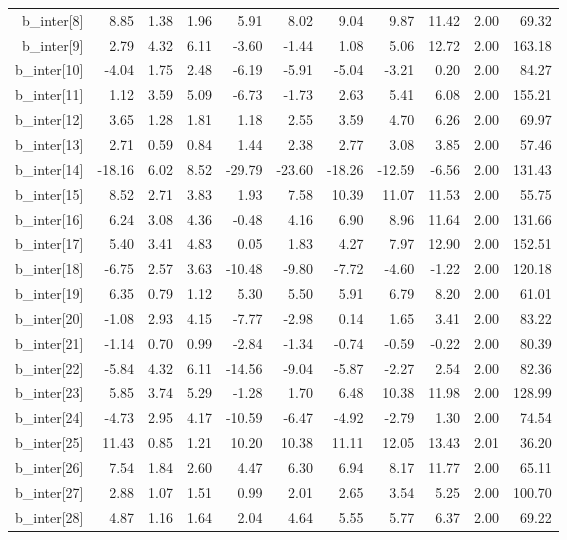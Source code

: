\documentclass[11pt]{article}
\begin{document}
\begin{table}[ht]
\begin{tabular}{rrrrrrrrrrr}
  b\_inter[8] & 8.85 & 1.38 & 1.96 & 5.91 & 8.02 & 9.04 & 9.87 & 11.42 & 2.00 & 69.32 \\ 
  b\_inter[9] & 2.79 & 4.32 & 6.11 & -3.60 & -1.44 & 1.08 & 5.06 & 12.72 & 2.00 & 163.18 \\ 
  b\_inter[10] & -4.04 & 1.75 & 2.48 & -6.19 & -5.91 & -5.04 & -3.21 & 0.20 & 2.00 & 84.27 \\ 
  b\_inter[11] & 1.12 & 3.59 & 5.09 & -6.73 & -1.73 & 2.63 & 5.41 & 6.08 & 2.00 & 155.21 \\ 
  b\_inter[12] & 3.65 & 1.28 & 1.81 & 1.18 & 2.55 & 3.59 & 4.70 & 6.26 & 2.00 & 69.97 \\ 
  b\_inter[13] & 2.71 & 0.59 & 0.84 & 1.44 & 2.38 & 2.77 & 3.08 & 3.85 & 2.00 & 57.46 \\ 
  b\_inter[14] & -18.16 & 6.02 & 8.52 & -29.79 & -23.60 & -18.26 & -12.59 & -6.56 & 2.00 & 131.43 \\ 
  b\_inter[15] & 8.52 & 2.71 & 3.83 & 1.93 & 7.58 & 10.39 & 11.07 & 11.53 & 2.00 & 55.75 \\ 
  b\_inter[16] & 6.24 & 3.08 & 4.36 & -0.48 & 4.16 & 6.90 & 8.96 & 11.64 & 2.00 & 131.66 \\ 
  b\_inter[17] & 5.40 & 3.41 & 4.83 & 0.05 & 1.83 & 4.27 & 7.97 & 12.90 & 2.00 & 152.51 \\ 
  b\_inter[18] & -6.75 & 2.57 & 3.63 & -10.48 & -9.80 & -7.72 & -4.60 & -1.22 & 2.00 & 120.18 \\ 
  b\_inter[19] & 6.35 & 0.79 & 1.12 & 5.30 & 5.50 & 5.91 & 6.79 & 8.20 & 2.00 & 61.01 \\ 
  b\_inter[20] & -1.08 & 2.93 & 4.15 & -7.77 & -2.98 & 0.14 & 1.65 & 3.41 & 2.00 & 83.22 \\ 
  b\_inter[21] & -1.14 & 0.70 & 0.99 & -2.84 & -1.34 & -0.74 & -0.59 & -0.22 & 2.00 & 80.39 \\ 
  b\_inter[22] & -5.84 & 4.32 & 6.11 & -14.56 & -9.04 & -5.87 & -2.27 & 2.54 & 2.00 & 82.36 \\ 
  b\_inter[23] & 5.85 & 3.74 & 5.29 & -1.28 & 1.70 & 6.48 & 10.38 & 11.98 & 2.00 & 128.99 \\ 
  b\_inter[24] & -4.73 & 2.95 & 4.17 & -10.59 & -6.47 & -4.92 & -2.79 & 1.30 & 2.00 & 74.54 \\ 
  b\_inter[25] & 11.43 & 0.85 & 1.21 & 10.20 & 10.38 & 11.11 & 12.05 & 13.43 & 2.01 & 36.20 \\ 
  b\_inter[26] & 7.54 & 1.84 & 2.60 & 4.47 & 6.30 & 6.94 & 8.17 & 11.77 & 2.00 & 65.11 \\ 
  b\_inter[27] & 2.88 & 1.07 & 1.51 & 0.99 & 2.01 & 2.65 & 3.54 & 5.25 & 2.00 & 100.70 \\ 
  b\_inter[28] & 4.87 & 1.16 & 1.64 & 2.04 & 4.64 & 5.55 & 5.77 & 6.37 & 2.00 & 69.22 \\ 
   \hline
\end{tabular}
\end{table}
\end{document}
